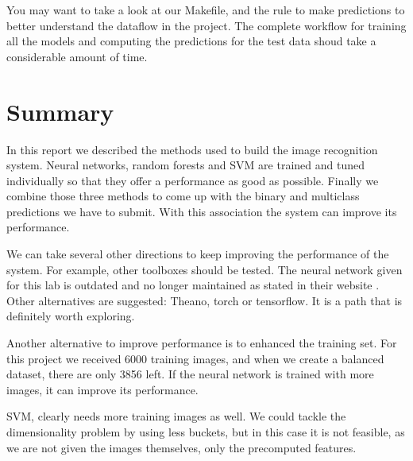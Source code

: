 \documentclass{article} %
\begin{document}
You may want to take a look at our Makefile, and the rule to make predictions to better understand the dataflow in the project. The complete workflow for training all the models and computing the predictions for the test data shoud take a considerable amount of time.

\section{Summary}

In this report we described the methods used to build the image recognition system. 
Neural networks, random forests and SVM are trained and tuned individually so that they offer a performance as good as possible.
Finally we combine those three methods to come up with the binary and multiclass predictions we have to submit. 
With this association the system can improve its performance.

We can take several other directions to keep improving the performance of the system.
For example, other toolboxes should be tested. The neural network given for this lab is outdated and no longer maintained as stated in their website \cite{deeplearningtoolbox}. Other alternatives are suggested: Theano, torch or tensorflow. It is a path that is definitely worth exploring.

Another alternative to improve performance is to enhanced the training set. 
For this project we received 6000 training images, and when we create a balanced dataset, there are only 3856 left.
If the neural network is trained with more images, it can improve its performance.

SVM, clearly needs more training images as well. We could tackle the dimensionality problem by using less buckets, but in this case it is not feasible, as we are not given the images themselves, only the precomputed features.



\end{document}
